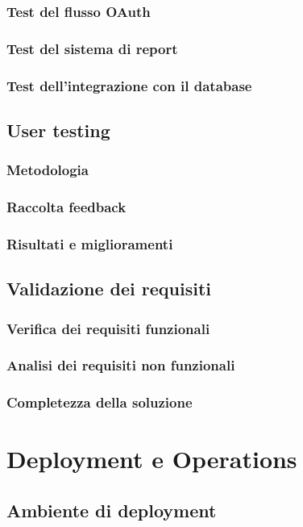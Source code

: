 \documentclass[12pt,a4paper,oneside]{report}
\begin{document}
\subsection{Test del flusso OAuth}
\subsection{Test del sistema di report}
\subsection{Test dell'integrazione con il database}

\section{User testing}
\subsection{Metodologia}
\subsection{Raccolta feedback}
\subsection{Risultati e miglioramenti}

\section{Validazione dei requisiti}
\subsection{Verifica dei requisiti funzionali}
\subsection{Analisi dei requisiti non funzionali}
\subsection{Completezza della soluzione}





\chapter{Deployment e Operations}
\section{Ambiente di deployment}
\end{document}

